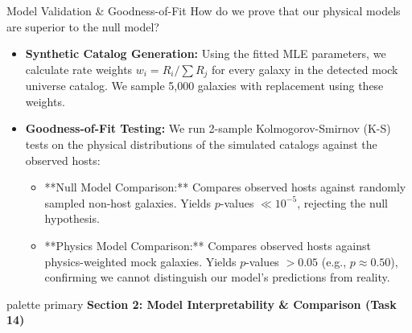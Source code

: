 \documentclass[9pt]{beamer}
\begin{document}
\begin{frame}{Model Validation \& Goodness-of-Fit}
  How do we prove that our physical models are superior to the null model?
  \begin{itemize}
    \item \textbf{Synthetic Catalog Generation:}
      Using the fitted MLE parameters, we calculate rate weights $w_i = R_i / \sum R_j$ for every galaxy in the detected mock universe catalog. We sample 5,000 galaxies with replacement using these weights.
    \item \textbf{Goodness-of-Fit Testing:}
      We run 2-sample Kolmogorov-Smirnov (K-S) tests on the physical distributions of the simulated catalogs against the observed hosts:
      \begin{itemize}
        \item **Null Model Comparison:** Compares observed hosts against randomly sampled non-host galaxies. Yields $p$-values $\ll 10^{-5}$, rejecting the null hypothesis.
        \item **Physics Model Comparison:** Compares observed hosts against physics-weighted mock galaxies. Yields $p$-values $> 0.05$ (e.g., $p \approx 0.50$), confirming we cannot distinguish our model's predictions from reality.
      \end{itemize}
  \end{itemize}
\end{frame}

\begin{frame}[plain]
  \vfill
  \centering
  \begin{beamercolorbox}[sep=8pt,center,shadow=true,rounded=true]{palette primary}
    \textbf{Section 2: Model Interpretability \& Comparison (Task 14)}
  \end{beamercolorbox}
  \vfill
\end{frame}
\end{document}
